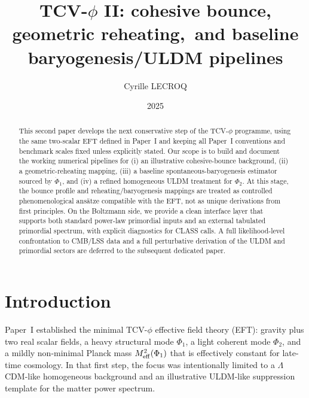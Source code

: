 \documentclass[aps,prd,onecolumn,nofootinbib,superscriptaddress]{revtex4-2}
\newcommand{\Meff}{M_{\rm eff}}
\begin{document}
\title{TCV-$\phi$ II: cohesive bounce, geometric reheating,\
and baseline baryogenesis/ULDM pipelines}

\author{Cyrille LECROQ}

\date{2025}

\begin{abstract}
This second paper develops the next conservative step of the TCV-$\phi$ programme, using the same two-scalar EFT defined in Paper~I and keeping all Paper~I conventions and benchmark scales fixed unless explicitly stated.
Our scope is to build and document the working numerical pipelines for (i) an illustrative cohesive-bounce background, (ii) a geometric-reheating mapping, (iii) a baseline spontaneous-baryogenesis estimator sourced by $\dot\Phi_1$, and (iv) a refined homogeneous ULDM treatment for $\Phi_2$.
At this stage, the bounce profile and reheating/baryogenesis mappings are treated as controlled phenomenological ans\"atze compatible with the EFT, not as unique derivations from first principles.
On the Boltzmann side, we provide a clean interface layer that supports both standard power-law primordial inputs and an external tabulated primordial spectrum, with explicit diagnostics for CLASS calls.
A full likelihood-level confrontation to CMB/LSS data and a full perturbative derivation of the ULDM and primordial sectors are deferred to the subsequent dedicated paper.
\end{abstract}

\maketitle

\section{Introduction}

Paper~I established the minimal TCV-$\phi$ effective field theory (EFT): gravity plus two real scalar fields, a heavy structural mode $\Phi_1$, a light coherent mode $\Phi_2$, and a mildly non-minimal Planck mass $\Meff^2(\Phi_1)$ that is effectively constant for late-time cosmology.
In that first step, the focus was intentionally limited to a $\Lambda$CDM-like homogeneous background and an illustrative ULDM-like suppression template for the matter power spectrum.
\end{document}
